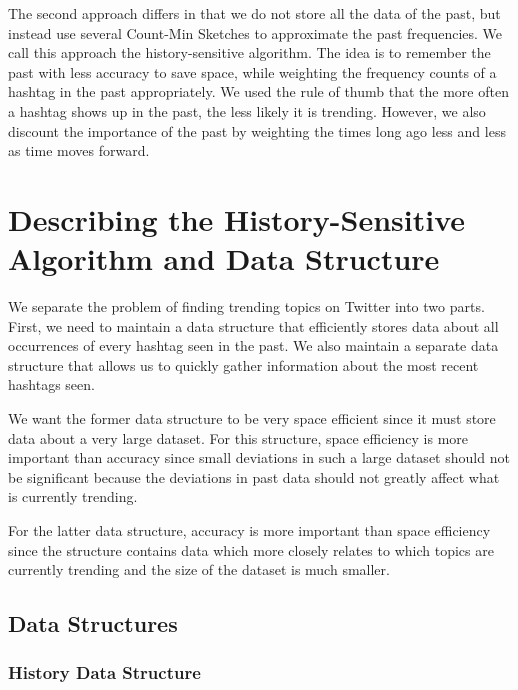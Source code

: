 \documentclass[twoside]{article}
\begin{document}
{The second approach differs in that we do not store all the data of the past, but instead use several Count-Min Sketches to approximate the past frequencies. We call this approach the history-sensitive algorithm.
The idea is to remember the past with less accuracy to save space, while weighting the frequency counts of a hashtag in the past appropriately. We used the rule of thumb that the more often a hashtag shows up in the past, the less likely it is trending. However, we also discount the importance of the past by weighting the times long ago less and less as time moves forward.


\section{Describing the History-Sensitive Algorithm and Data Structure}

We separate the problem of finding trending topics on Twitter into two parts.  First, we need to maintain a data structure that efficiently stores data about all occurrences of every hashtag seen in the past.  We also maintain a separate data structure that allows us to quickly gather information about the most recent hashtags seen.

We want the former data structure to be very space efficient since it must store data about a very large dataset.  For this structure, space efficiency is more important than accuracy since small deviations in such a large dataset should not be significant because the deviations in past data should not greatly affect what is currently trending.

For the latter data structure, accuracy is more important than space efficiency since the structure contains data which more closely relates to which topics are currently trending and the size of the dataset is much smaller.


\subsection{Data Structures}
\subsubsection{History Data Structure}

}
\end{document}
